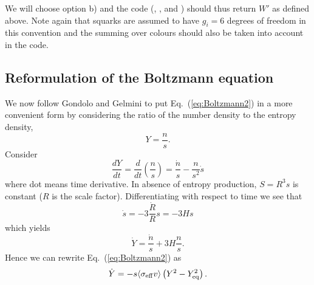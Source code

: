 We will choose option b) and the code (, ,  and ) should thus return $W'$ as defined above. Note again that squarks are assumed to have $g_i=6$ degrees of freedom in this convention and the summing over colours should also be taken into account in the code.


\subsection{Reformulation of the Boltzmann equation}

We now follow Gondolo and Gelmini \cite{GondoloGelmini} to 
put Eq.~(\ref{eq:Boltzmann2}) in a more convenient form by
considering the ratio of the number density to the entropy density,
\begin{equation} \label{eq:ydef}
  Y = \frac{n}{s}.
\end{equation}
Consider
\begin{equation}
  \frac{dY}{dt} = \frac{d}{dt} \left( \frac{n}{s} \right) = 
  \frac{\dot{n}}{s}-\frac{n}{s^2}\dot{s}
\end{equation}
where dot means time derivative. In absence
of entropy production, $S=R^3s$ is constant ($R$ is the scale factor).
Differentiating with respect to time we see 
that
\begin{equation}
  \dot{s} = -3\frac{\dot{R}}{R} s = -3Hs
\label{eq:entropycons}
\end{equation}
which yields
\begin{equation}
  \dot{Y} = \frac{\dot{n}}{s} + 3H \frac{n}{s}.
\end{equation}
Hence we can rewrite Eq.~(\ref{eq:Boltzmann2}) as
\begin{equation} \label{eq:Boltzmann3}
  \dot{Y} = -s  \langle \sigma_{\rm{eff}} v \rangle 
  \left( Y^2 - Y_{\rm{eq}}^2 \right).
\end{equation}

